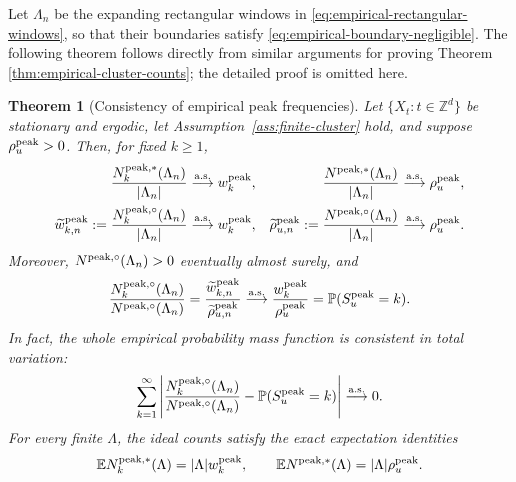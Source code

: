\documentclass[aap,preprint]{imsart}
\theoremstyle{plain}
\newtheorem{theorem}{Theorem}[section]
\theoremstyle{definition}
\def\E{{\mathbb E}}
\def\P{{\mathbb P}}
\def\Z{{\mathbb Z}}
\begin{document}
Let $\Lambda_n$ be the expanding rectangular windows in
\eqref{eq:empirical-rectangular-windows}, so that their
boundaries satisfy \eqref{eq:empirical-boundary-negligible}. The following theorem follows directly from similar arguments for proving Theorem \ref{thm:empirical-cluster-counts}; the detailed proof is omitted here.

\begin{theorem}[Consistency of empirical peak frequencies]
	\label{thm:empirical-peak-counts}
	Let $\{X_t:t\in\Z^d\}$ be stationary and ergodic, let
	Assumption~\ref{ass:finite-cluster} hold, and suppose
	$\rho_u^{\rm peak}>0$.  Then, for fixed $k\geq1$,
	\begin{align}
		\frac{N_k^{{\rm peak},*}(\Lambda_n)}{|\Lambda_n|}
		&\overset{\rm a.s.}{\longrightarrow}w_k^{\rm peak},
		&
		\frac{N^{{\rm peak},*}(\Lambda_n)}{|\Lambda_n|}
		&\overset{\rm a.s.}{\longrightarrow}\rho_u^{\rm peak},
		\nonumber
		\\
		\widetilde w_{k,n}^{\rm peak}
		:=\frac{N_k^{{\rm peak},\circ}(\Lambda_n)}{|\Lambda_n|}
		&\overset{\rm a.s.}{\longrightarrow}w_k^{\rm peak},
		&
		\widetilde \rho_{u,n}^{\rm peak}
		:=\frac{N^{{\rm peak},\circ}(\Lambda_n)}{|\Lambda_n|}
		&\overset{\rm a.s.}{\longrightarrow}\rho_u^{\rm peak}.
		\label{eq:w-peak-empirical}
	\end{align}
	Moreover, $N^{{\rm peak},\circ}(\Lambda_n)>0$ eventually almost surely,
	and
	\begin{equation}\label{eq:empirical-peak-ratio}
		\frac{N_k^{{\rm peak},\circ}(\Lambda_n)}
		{N^{{\rm peak},\circ}(\Lambda_n)} = \frac{\widetilde w_{k,n}^{\rm peak}}{\widetilde \rho_{u,n}^{\rm peak}}
		\overset{\rm a.s.}{\longrightarrow}
		\frac{w_k^{\rm peak}}{\rho_u^{\rm peak}}
		=\P(S_u^{\rm peak}=k).
	\end{equation}
	In fact, the whole empirical probability mass function is consistent in total variation:
	\begin{equation*}
		\sum_{k=1}^{\infty}
		\left|
		\frac{N_k^{{\rm peak},\circ}(\Lambda_n)}
		{N^{{\rm peak},\circ}(\Lambda_n)}
		-\P(S_u^{\rm peak}=k)
		\right|
		\overset{\rm a.s.}{\longrightarrow}0.
	\end{equation*}
	For every finite $\Lambda$, the ideal counts satisfy the exact expectation
	identities
	\begin{equation*}
		\E N_k^{{\rm peak},*}(\Lambda)=|\Lambda|w_k^{\rm peak},
		\qquad
		\E N^{{\rm peak},*}(\Lambda)=|\Lambda|\rho_u^{\rm peak}.
	\end{equation*}
\end{theorem}
\end{document}
